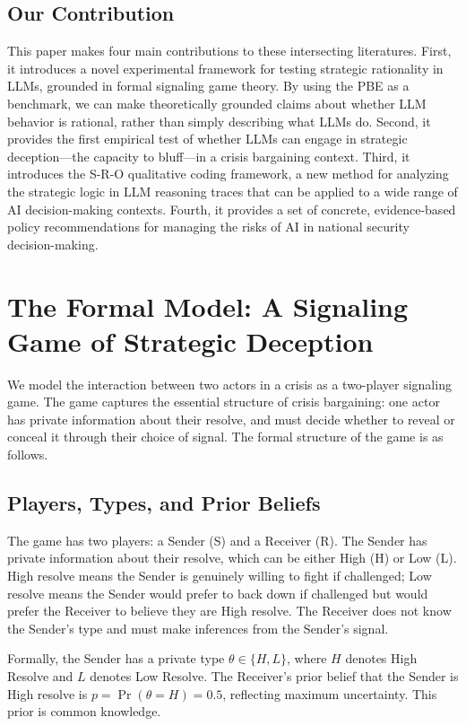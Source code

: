 \documentclass[12pt]{article}
\theoremstyle{plain}
\theoremstyle{definition}
\begin{document}
\subsection{Our Contribution}

This paper makes four main contributions to these intersecting literatures. First, it introduces a novel experimental framework for testing strategic rationality in LLMs, grounded in formal signaling game theory. By using the PBE as a benchmark, we can make theoretically grounded claims about whether LLM behavior is rational, rather than simply describing what LLMs do. Second, it provides the first empirical test of whether LLMs can engage in strategic deception---the capacity to bluff---in a crisis bargaining context. Third, it introduces the S-R-O qualitative coding framework, a new method for analyzing the strategic logic in LLM reasoning traces that can be applied to a wide range of AI decision-making contexts. Fourth, it provides a set of concrete, evidence-based policy recommendations for managing the risks of AI in national security decision-making.

\section{The Formal Model: A Signaling Game of Strategic Deception}

We model the interaction between two actors in a crisis as a two-player signaling game. The game captures the essential structure of crisis bargaining: one actor has private information about their resolve, and must decide whether to reveal or conceal it through their choice of signal. The formal structure of the game is as follows.

\subsection{Players, Types, and Prior Beliefs}

The game has two players: a Sender (S) and a Receiver (R). The Sender has private information about their resolve, which can be either High (H) or Low (L). High resolve means the Sender is genuinely willing to fight if challenged; Low resolve means the Sender would prefer to back down if challenged but would prefer the Receiver to believe they are High resolve. The Receiver does not know the Sender's type and must make inferences from the Sender's signal.

Formally, the Sender has a private type $\theta \in \{H, L\}$, where $H$ denotes High Resolve and $L$ denotes Low Resolve. The Receiver's prior belief that the Sender is High resolve is $p = \Pr(\theta = H) = 0.5$, reflecting maximum uncertainty. This prior is common knowledge.
\end{document}
